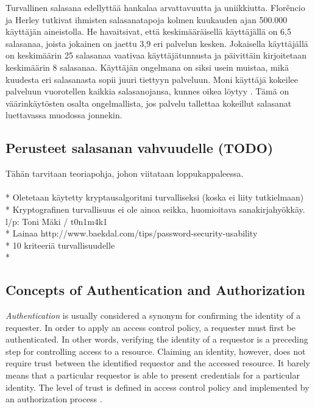 \documentclass[english,gradu]{tktltiki}
\begin{document}
Turvallinen salasana edellyttää hankalaa arvattavuutta ja uniikkiutta. Florêncio ja Herley \cite{study_of_passwords_07} tutkivat ihmisten salasanatapoja kolmen kuukauden ajan 500.000 käyttäjän aineistolla. He havaitsivat, että keskimääräisellä käyttäjällä on 6,5 salasanaa, joista jokainen on jaettu 3,9 eri palvelun kesken. Jokaisella käyttäjällä on keskimäärin 25 salasanaa vaativaa käyttäjätunnusta ja päivittäin kirjoitetaan keskimäärin 8 salasanaa. Käyttäjän ongelmana on siksi usein muistaa, mikä kuudesta eri salasanasta sopii juuri tiettyyn palveluun. Moni käyttäjä kokeilee palveluun vuorotellen kaikkia salasanojansa, kunnes oikea löytyy \cite{study_of_passwords_07}. Tämä on väärinkäytösten osalta ongelmallista, jos palvelu tallettaa kokeillut salasanat luettavassa muodossa jonnekin.

\subsection{Perusteet salasanan vahvuudelle (TODO)}
Tähän tarvitaan teoriapohja, johon viitataan loppukappaleessa.
 \\
 \\ * Oletetaan käytetty kryptausalgoritmi turvalliseksi (koska ei liity tutkielmaan)
 \\ * Kryptografinen turvallisuus ei ole ainoa seikka, huomioitava sanakirjahyökkäy. l/p: Toni Mäki / t0n1m4k1
 \\ * Lainaa http://www.baekdal.com/tips/password-security-usability
 \\ * 10 kriteeriä turvallisuudelle \cite{schneier_password_advice_09}
 \\ *


\subsection{Concepts of Authentication and Authorization}

    \emph{Authentication} is usually considered a synonym for confirming the identity of a requester. In order to apply an access control policy, a requester must first be authenticated. In other words, verifying the identity of a requestor is a preceding step for controlling access to a resource. Claiming an identity, however, does not require trust between the identified requestor and the accessed resource. It barely means that a particular requestor is able to present credentials for a particular identity. The level of trust is defined in access control policy and implemented by an authorization process \cite{lampson_distributed_1992}.
\end{document}
